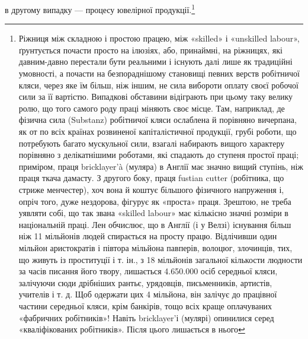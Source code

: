 в другому випадку — процесу ювелірної продукції.\footnote{
Ріжниця між складною і простою працею, між «skilled» і «unskilled
labour», ґрунтується почасти просто на ілюзіях, або, принаймні,
на ріжницях, які давним-давно перестали бути реальними і існують далі
лише як традиційні умовності, а почасти на безпораднішому становищі
певних верств робітничої кляси, через яке їм більш, ніж іншим, не сила
вибороти оплату своєї робочої сили за її вартістю. Випадкові обставини
відіграють при цьому таку велику ролю, що того самого роду праці міняють
своє місце. Там, наприклад, де фізична сила (Substanz) робітничої кляси
ослаблена й порівняно вичерпана, як от по всіх країнах розвиненої капіталістичної
продукції, грубі роботи, що потребують багато мускульної сили,
взагалі набирають вищого характеру порівняно з делікатнішими роботами,
які спадають до ступеня простої праці; приміром, праця bricklayer’à (муляра)
в Англії має значно вищий ступінь, ніж праця ткача дамасту.
З другого боку, праця fustian cutter (робітника, що стриже менчестер),
хоч вона й коштує більшого фізичного напруження і, опріч того, дуже нездорова,
фігурує як «проста» праця. Зрештою, не треба уявляти собі, що
так звана «skilled labour» має кількісно значні розміри в національній
праці. Лен обчислює, що в Англії (і у Велзі) існування більш ніж
11 мільйонів людей спирається на просту працю. Відлічивши один мільйон
аристократів і півтора мільйона павперів, волоцюг, злочинців, тих, що
живуть із проституції і т. ін., з 18 мільйонів загальної кількости людности
за часів писання його твору, лишається 4.650.000 осіб середньої
кляси, залічуючи сюди дрібніших рантьє, урядовців, письменників,
артистів, учителів і т. д. Щоб одержати цих 4 мільйона, він залічує до
працівної частини середньої кляси, крім банкірів, тощо всіх краще оплачуваних
«фабричних робітників»! Навіть bricklayer’і (мулярі) опинилися
серед «кваліфікованих робітників». Після цього лишається в нього
}

